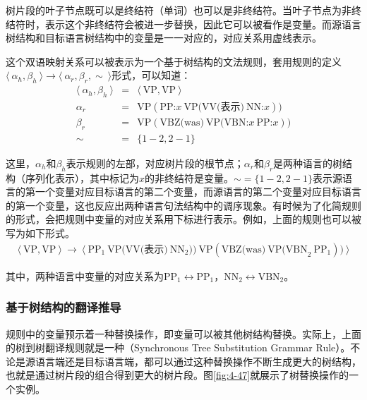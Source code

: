 \parinterval 树片段的叶子节点既可以是终结符（单词）也可以是非终结符。当叶子节点为非终结符时，表示这个非终结符会被进一步替换，因此它可以被看作是变量。而源语言树结构和目标语言树结构中的变量是一一对应的，对应关系用虚线表示。

\parinterval 这个双语映射关系可以被表示为一个基于树结构的文法规则，套用规则的定义$\langle\  \alpha_h, \beta_h\ \rangle \to \langle\ \alpha_r, \beta_r, \sim\ \rangle$形式，可以知道：
\begin{eqnarray}
\langle\ \alpha_h, \beta_h\ \rangle &=& \langle\ \textrm{VP}, \textrm{VP}\ \rangle \nonumber \\
\alpha_r &=& \textrm{VP}(\textrm{PP:}x\ \textrm{VP(VV(表示)}\ \textrm{NN:}x)) \nonumber \\
\beta_r &=& \textrm{VP}(\textrm{VBZ(was)}\ \textrm{VP(VBN:}x\ \textrm{PP:}x)) \nonumber \\
\sim &=& \{1-2,2-1\} \nonumber
\end{eqnarray}

\parinterval 这里，$\alpha_h$和$\beta_h$表示规则的左部，对应树片段的根节点；$\alpha_r$和$\beta_r$是两种语言的树结构（序列化表示），其中标记为$x$的非终结符是变量。$\sim = \{1-2,2-1\}$表示源语言的第一个变量对应目标语言的第二个变量，而源语言的第二个变量对应目标语言的第一个变量，这也反应出两种语言句法结构中的调序现象。有时候为了化简规则的形式，会把规则中变量的对应关系用下标进行表示。例如，上面的规则也可以被写为如下形式。
\begin{eqnarray}
\langle\ \textrm{VP}, \textrm{VP}\ \rangle\ \to\ \langle\ \textrm{PP}_{1} \ \textrm{VP(VV(表示)}\ \textrm{NN}_{2}))\ \textrm{VP}(\textrm{VBZ(was)}\ \textrm{VP(VBN}_{2} \ \textrm{PP}_{1})) \ \rangle \nonumber
\end{eqnarray}

\noindent 其中，两种语言中变量的对应关系为$\textrm{PP}_1 \leftrightarrow \textrm{PP}_1$，$\textrm{NN}_2 \leftrightarrow \textrm{VBN}_2$。


\subsubsection{基于树结构的翻译推导}

\parinterval 规则中的变量预示着一种替换操作，即变量可以被其他树结构替换。实际上，上面的树到树翻译规则就是一种{\small{}}（Synchronous Tree Substitution Grammar Rule）。不论是源语言端还是目标语言端，都可以通过这种替换操作不断生成更大的树结构，也就是通过树片段的组合得到更大的树片段。图\ref{fig:4-47}就展示了树替换操作的一个实例。

